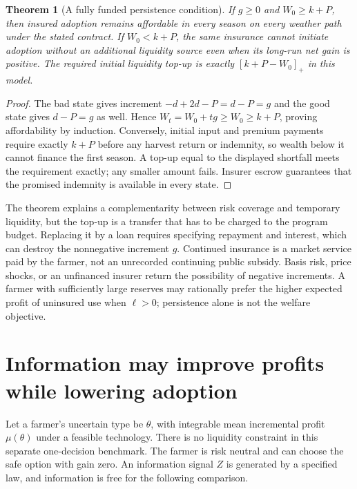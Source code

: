 \documentclass[11pt]{article}
\newtheorem{theorem}{Theorem}
\theoremstyle{remark}
\begin{document}
\begin{theorem}[A fully funded persistence condition]\label{insurance}
If $g\geq0$ and $W_0\geq k+P$, then insured adoption remains affordable in every season on every weather path under the stated contract. If $W_0<k+P$, the same insurance cannot initiate adoption without an additional liquidity source even when its long-run net gain is positive. The required initial liquidity top-up is exactly $[k+P-W_0]_+$ in this model.
\end{theorem}
\begin{proof}
The bad state gives increment $-d+2d-P=d-P=g$ and the good state gives $d-P=g$ as well. Hence $W_t=W_0+tg\geq W_0\geq k+P$, proving affordability by induction. Conversely, initial input and premium payments require exactly $k+P$ before any harvest return or indemnity, so wealth below it cannot finance the first season. A top-up equal to the displayed shortfall meets the requirement exactly; any smaller amount fails. Insurer escrow guarantees that the promised indemnity is available in every state.
\end{proof}

The theorem explains a complementarity between risk coverage and temporary liquidity, but the top-up is a transfer that has to be charged to the program budget. Replacing it by a loan requires specifying repayment and interest, which can destroy the nonnegative increment $g$. Continued insurance is a market service paid by the farmer, not an unrecorded continuing public subsidy. Basis risk, price shocks, or an unfinanced insurer return the possibility of negative increments. A farmer with sufficiently large reserves may rationally prefer the higher expected profit of uninsured use when $\ell>0$; persistence alone is not the welfare objective.

\section{Information may improve profits while lowering adoption}
Let a farmer's uncertain type be $\theta$, with integrable mean incremental profit $\mu(\theta)$ under a feasible technology. There is no liquidity constraint in this separate one-decision benchmark. The farmer is risk neutral and can choose the safe option with gain zero. An information signal $Z$ is generated by a specified law, and information is free for the following comparison.
\end{document}
